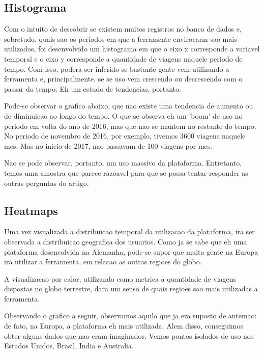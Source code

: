 \documentclass[10pt, conference]{IEEEtran}
\begin{document}
\subsection{Histograma}

Com o intuito de descobrir se existem muitos registros no banco de dados e, sobretudo,
quais sao os periodos em que a ferramente envirocarm sao mais utilizados, foi desenvolvido
um histograma em que o eixo x corresponde a variavel temporal e o eixo y corresponde
a quantidade de viagens naquele periodo de tempo. Com isso, podera ser inferido se bastante
gente vem utilizando a ferramenta e, principalmente, se se uso vem crescendo ou decrescendo
com o passar do tempo. Eh um estudo de tendencias, portanto.

Pode-se observar o grafico abaixo, que nao existe uma tendencia de aumento ou de diminuicao
ao longo do tempo. O que se observa eh um 'boom' de uso no periodo em volta do ano de 2016,
mas que nao se mantem no restante do tempo. No periodo de novembro de 2016, por exemplo, 
tivemos 3600 viagens naquele mes. Mas no inicio de 2017, nao passavam de 100 viagens por mes.

Nao se pode observar, portanto, um uso massivo da plataforma. Entretanto, temos uma amostra
que parece razoavel para que se possa tentar responder as outras perguntas do artigo.



\subsection{Heatmaps}

Uma vez visualizada a distribuicao temporal da utilizacao da plataforma, ira ser observada a
distribuicao geografica dos usuarios. Como ja se sabe que eh uma plataforma desenvolvida
na Alemanha, pode-se supor que muita gente na Europa ira utilizar a ferramenta, em relacao
as outras regioes do globo.

A visualizacao por calor, utilizando como metrica a quantidade de viagens dispostas no globo
terrestre, dara um senso de quais regioes sao mais utilizadas a ferramenta.

Observando o grafico a seguir, observamos aquilo que ja era suposto de antemao: de fato,
na Europa, a plataforma eh mais utilizada. Alem disso, conseguimos obter alguns dados que nao
eram imaginados. Vemos pontos isolados de uso nos Estados Unidos, Brasil, India e Australia.
\end{document}
